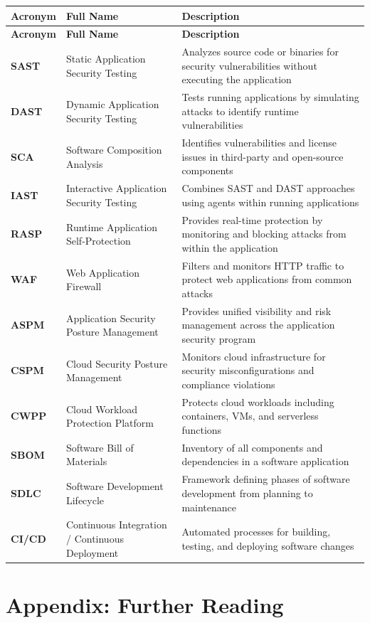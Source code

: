 \documentclass[11pt,letterpaper]{article}
\begin{document}
\begin{longtable}{>{\bfseries}p{2.5cm} p{4cm} p{6.5cm}}
\toprule
\textbf{Acronym} & \textbf{Full Name} & \textbf{Description} \\
\midrule
\endfirsthead
\toprule
\textbf{Acronym} & \textbf{Full Name} & \textbf{Description} \\
\midrule
\endhead
\bottomrule
\endfoot
SAST & Static Application Security Testing & Analyzes source code or binaries for security vulnerabilities without executing the application \\
DAST & Dynamic Application Security Testing & Tests running applications by simulating attacks to identify runtime vulnerabilities \\
SCA & Software Composition Analysis & Identifies vulnerabilities and license issues in third-party and open-source components \\
IAST & Interactive Application Security Testing & Combines SAST and DAST approaches using agents within running applications \\
RASP & Runtime Application Self-Protection & Provides real-time protection by monitoring and blocking attacks from within the application \\
WAF & Web Application Firewall & Filters and monitors HTTP traffic to protect web applications from common attacks \\
ASPM & Application Security Posture Management & Provides unified visibility and risk management across the application security program \\
CSPM & Cloud Security Posture Management & Monitors cloud infrastructure for security misconfigurations and compliance violations \\
CWPP & Cloud Workload Protection Platform & Protects cloud workloads including containers, VMs, and serverless functions \\
SBOM & Software Bill of Materials & Inventory of all components and dependencies in a software application \\
SDLC & Software Development Lifecycle & Framework defining phases of software development from planning to maintenance \\
CI/CD & Continuous Integration / Continuous Deployment & Automated processes for building, testing, and deploying software changes \\
\end{longtable}

\section{Appendix: Further Reading}
\end{document}

